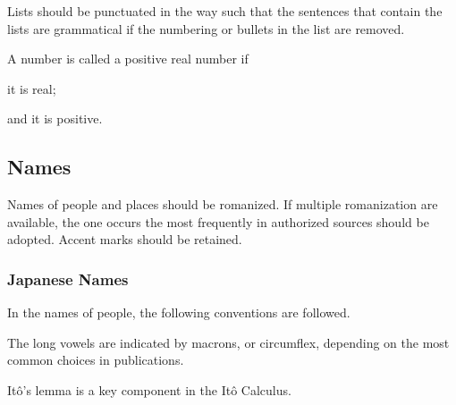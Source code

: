 \documentclass[hidelinks]{article}
\begin{document}
Lists should be punctuated in the way such that the sentences that contain the lists are grammatical if the numbering or bullets in the list are removed.
\begin{sample}
    A number is called a positive real number if
    \begin{cenum}
        \item it is real;
        \item and it is positive.
    \end{cenum}
\end{sample}


\subsection{Names} %
\label{sub:names}

Names of people and places should be romanized. If multiple romanization are available, the one occurs the most frequently in authorized sources should be adopted. Accent marks should be retained.

\subsubsection{Japanese Names} %
\label{ssub:japanese_names}

In the names of people, the following conventions are followed.
\begin{cenum}
    \item The long vowels are indicated by macrons, or circumflex, depending on the most common choices in publications.
\end{cenum}
\begin{sample}
    It\^o's lemma is a key component in the It\^o Calculus.
\end{sample}



\end{document}
